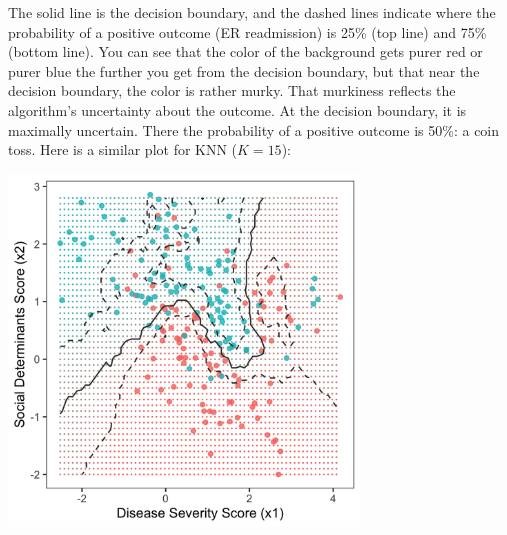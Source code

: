The solid line is the decision boundary, and the dashed lines indicate where the probability of a positive outcome (ER readmission) is 25\% (top line) and 75\% (bottom line). You can see that the color of the background gets purer red or purer blue the further you get from the decision boundary, but that near the decision boundary, the color is rather murky. That murkiness reflects the algorithm's uncertainty about the outcome. At the decision boundary, it is maximally uncertain. There the probability of a positive outcome is 50\%: a coin toss. Here is a similar plot for KNN ($K=15$): 
\begin{center}
\includegraphics[width=0.7\textwidth]{img/esl-knn-15-prob.png}
\end{center}

